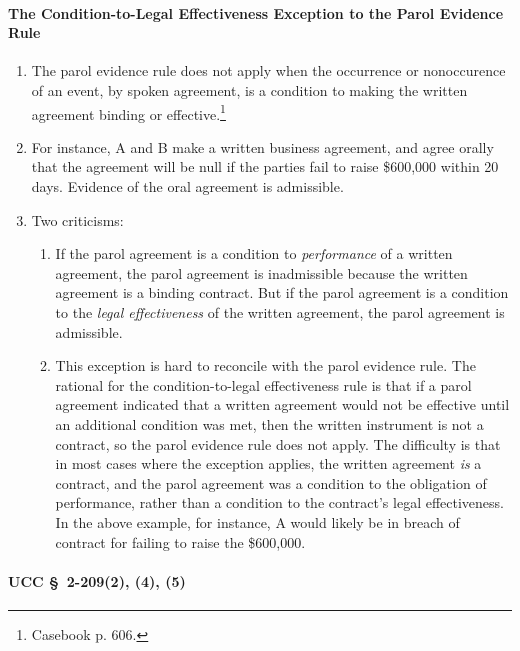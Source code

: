 \paragraph{The Condition-to-Legal Effectiveness Exception to the Parol 
Evidence Rule}

\begin{enumerate}
    \item The parol evidence rule does not apply when the occurrence or 
    nonoccurence of an event, by spoken agreement, is a condition to making 
    the written agreement binding or effective.\footnote{Casebook p. 606.}
    \item For instance, A and B make a written business agreement, and agree 
    orally that the agreement will be null if the parties fail to raise 
    \$600,000 within 20 days. Evidence of the oral agreement is admissible.
    \item Two criticisms:
    \begin{enumerate}
        \item If the parol agreement is a condition to \emph{performance} of a 
        written agreement, the parol agreement is inadmissible because the 
        written agreement is a binding contract. But if the parol agreement is 
        a condition to the \emph{legal effectiveness} of the written 
        agreement, the parol agreement is admissible.
        \item This exception is hard to reconcile with the parol evidence 
        rule. The rational for the condition-to-legal effectiveness rule is 
        that if a parol agreement indicated that a written agreement would not 
        be effective until an additional condition was met, then the written 
        instrument is not a contract, so the parol evidence rule does not 
        apply. The difficulty is that in most cases where the exception 
        applies, the written agreement \emph{is} a contract, and the parol 
        agreement was a condition to the obligation of performance, rather 
        than a condition to the contract's legal effectiveness. In the above 
        example, for instance, A would likely be in breach of contract for 
        failing to raise the \$600,000.
    \end{enumerate}
\end{enumerate}

\paragraph{UCC \S\ 2-209(2), (4), (5)}

